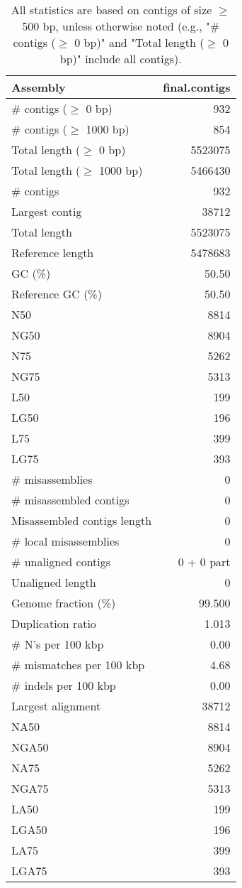 \documentclass[12pt,a4paper]{article}
\begin{document}
\begin{table}[ht]
\begin{center}
\caption{All statistics are based on contigs of size $\geq$ 500 bp, unless otherwise noted (e.g., "\# contigs ($\geq$ 0 bp)" and "Total length ($\geq$ 0 bp)" include all contigs).}
\begin{tabular}{|l*{1}{|r}|}
\hline
Assembly & final.contigs \\ \hline
\# contigs ($\geq$ 0 bp) & 932 \\ \hline
\# contigs ($\geq$ 1000 bp) & 854 \\ \hline
Total length ($\geq$ 0 bp) & 5523075 \\ \hline
Total length ($\geq$ 1000 bp) & 5466430 \\ \hline
\# contigs & 932 \\ \hline
Largest contig & 38712 \\ \hline
Total length & 5523075 \\ \hline
Reference length & 5478683 \\ \hline
GC (\%) & 50.50 \\ \hline
Reference GC (\%) & 50.50 \\ \hline
N50 & 8814 \\ \hline
NG50 & 8904 \\ \hline
N75 & 5262 \\ \hline
NG75 & 5313 \\ \hline
L50 & 199 \\ \hline
LG50 & 196 \\ \hline
L75 & 399 \\ \hline
LG75 & 393 \\ \hline
\# misassemblies & 0 \\ \hline
\# misassembled contigs & 0 \\ \hline
Misassembled contigs length & 0 \\ \hline
\# local misassemblies & 0 \\ \hline
\# unaligned contigs & 0 + 0 part \\ \hline
Unaligned length & 0 \\ \hline
Genome fraction (\%) & 99.500 \\ \hline
Duplication ratio & 1.013 \\ \hline
\# N's per 100 kbp & 0.00 \\ \hline
\# mismatches per 100 kbp & 4.68 \\ \hline
\# indels per 100 kbp & 0.00 \\ \hline
Largest alignment & 38712 \\ \hline
NA50 & 8814 \\ \hline
NGA50 & 8904 \\ \hline
NA75 & 5262 \\ \hline
NGA75 & 5313 \\ \hline
LA50 & 199 \\ \hline
LGA50 & 196 \\ \hline
LA75 & 399 \\ \hline
LGA75 & 393 \\ \hline
\end{tabular}
\end{center}
\end{table}
\end{document}
